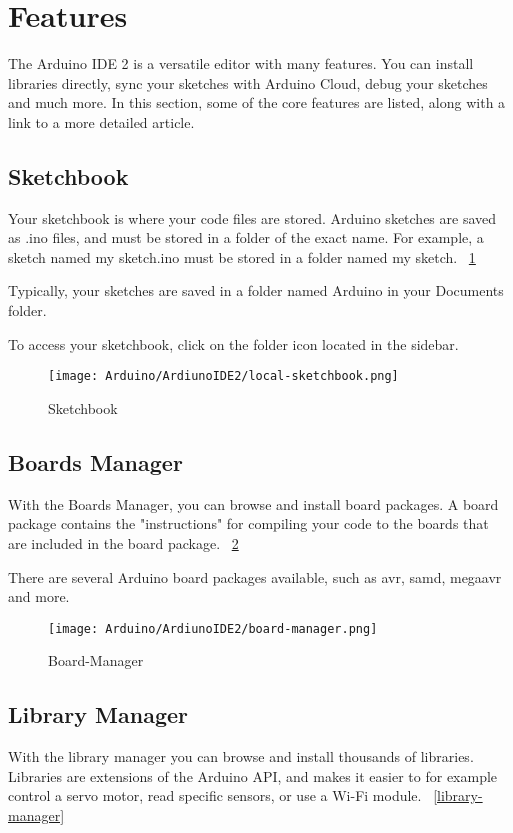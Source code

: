 \section{Features}
The Arduino IDE 2 is a versatile editor with many features. You can install libraries directly, sync your sketches with Arduino Cloud, debug your sketches and much more. In this section, some of the core features are listed, along with a link to a more detailed article. 

\subsection{Sketchbook}
Your sketchbook is where your code files are stored. Arduino sketches are saved as .ino files, and must be stored in a folder of the exact name. For example, a sketch named my sketch.ino must be stored in a folder named my sketch. ~\ref{local-sketchbook}

Typically, your sketches are saved in a folder named Arduino in your Documents folder.

To access your sketchbook, click on the folder icon located in the sidebar.
\begin{figure}
    \begin{center}
        \texttt{[image: Arduino/ArdiunoIDE2/local-sketchbook.png]}
        \caption{Sketchbook}
        \label{local-sketchbook}
    \end{center}
\end{figure}

\subsection{Boards Manager}
With the Boards Manager, you can browse and install board packages. A board package contains the "instructions" for compiling your code to the boards that are included in the board package. ~\ref{board-manager}

There are several Arduino board packages available, such as avr, samd, megaavr and more.
\begin{figure}
    \begin{center}
        \texttt{[image: Arduino/ArdiunoIDE2/board-manager.png]}
        \caption{Board-Manager}
        \label{board-manager}
    \end{center}
\end{figure}

\subsection{Library Manager}
With the library manager you can browse and install thousands of libraries. Libraries are extensions of the Arduino API, and makes it easier to for example control a servo motor, read specific sensors, or use a Wi-Fi module. ~\ref{library-manager}

